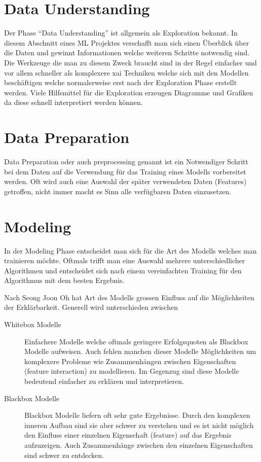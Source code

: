 \documentclass[
  12pt, %
  a4paper, %
  oneside, %
  openany, 
  numbers=noenddot, %
  BCOR=5mm, %
  parskip=half*, %
  thesis, %
]{bfhbook}
\begin{document}
\section{Data Understanding}
Der Phase ``Data Understanding'' ist allgemein als Exploration bekannt.
In diesem Abschnitt eines \Gls{ML} Projektes verschafft man sich einen Überblick über die Daten und gewinnt Informationen welche weiteren Schritte notwendig sind. Die Werkzeuge die man zu diesem Zweck braucht sind in der Regel einfacher und vor allem schneller als komplexere \Gls{xai} Techniken welche sich mit den Modellen beschäftigen welche normalerweise erst nach der Exploration Phase erstellt werden. Viele Hilfsmittel für die Exploration erzeugen Diagramme und Grafiken da diese schnell interpretiert werden können.

\section{Data Preparation}
Data Preparation oder auch preprocessing genannt ist ein Notwendiger Schritt bei dem Daten auf die Verwendung für das Training eines Modells vorbereitet werden. Oft wird auch eine Auswahl der später verwendeten Daten (Features) getroffen, nicht immer macht es Sinn alle verfügbaren Daten einzusetzen.

\section{Modeling}
In der Modeling Phase entscheidet man sich für die Art des Modells welches man trainieren möchte. Oftmals trifft man eine Auswahl mehrere unterschiedlicher Algorithmen und entscheidet sich nach einem vereinfachten Training für den Algorithmus mit dem besten Ergebnis.

Nach Seong Joon Oh \parencite{Oh2019} hat Art des Modells grossen Einfluss auf die Möglichkeiten der Erklärbarkeit. Generell wird unterschieden zwischen
\begin{description}
	\item[Whitebox Modelle] Einfachere Modelle welche oftmals geringere Erfolgsquoten als Blackbox Modelle aufweisen. Auch fehlen manchen dieser Modelle Möglichkeiten um komplexere Probleme wie Zusammenhängen zwischen Eigenschaften (feature interaction) zu modellieren. Im Gegenzug sind diese Modelle bedeutend einfacher zu erklären und interpretieren.
	\item[Blackbox Modelle] Blackbox Modelle liefern oft sehr gute Ergebnisse. Durch den komplexen inneren Aufbau sind sie aber schwer zu verstehen und es ist nicht möglich den Einfluss einer einzelnen Eigenschaft (feature) auf das Ergebnis aufzuzeigen. Auch Zusammenhänge zwischen den einzelnen Eigenschaften sind schwer zu entdecken.
\end{description}
\end{document}
